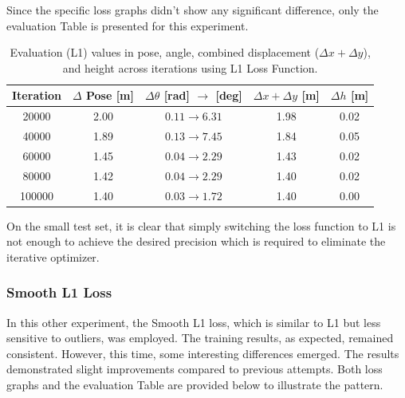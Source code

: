 Since the specific loss graphs didn’t show any significant difference, only the evaluation Table is presented for this experiment.
\begin{table}[H]
    \centering
    \scriptsize
    \renewcommand{\arraystretch}{1.2} 
    \setlength{\tabcolsep}{10pt} 
    \begin{tabular}{c c c c c}
        \toprule
        \textbf{Iteration} & \textbf{$\Delta$ Pose [m]} & \textbf{$\Delta \theta$ [rad] $\rightarrow$ [deg]} & \textbf{$\Delta x + \Delta y$ [m]} & \textbf{$\Delta h$ [m]} \\
        \midrule
        \num{20000}  & 2.00 & $0.11 \rightarrow 6.31$  & 1.98 & 0.02 \\
        \num{40000}  & 1.89 & $0.13 \rightarrow 7.45$  & 1.84 & 0.05 \\
        \num{60000}  & 1.45 & $0.04 \rightarrow 2.29$  & 1.43 & 0.02 \\
        \num{80000}  & 1.42 & $0.04 \rightarrow 2.29$  & 1.40 & 0.02 \\
        \num{100000} & 1.40 & $0.03 \rightarrow 1.72$  & 1.40 & 0.00 \\
        \bottomrule
    \end{tabular}
    \caption{Evaluation (L1) values in pose, angle, combined displacement ($\Delta x + \Delta y$), and height across iterations using L1 Loss Function.}
    \label{tab:pose_variations_l1}
\end{table}
On the small test set, it is clear that simply switching the loss function to L1 is not enough to achieve the desired precision which is required to eliminate the iterative optimizer.

\subsubsection*{Smooth L1 Loss}
In this other experiment, the Smooth L1 loss, which is similar to L1 but less sensitive to outliers, was employed. The training results, as expected, remained consistent. However, this time, some interesting differences emerged. The results demonstrated slight improvements compared to previous attempts. Both loss graphs and the evaluation Table are provided below to illustrate the pattern.

